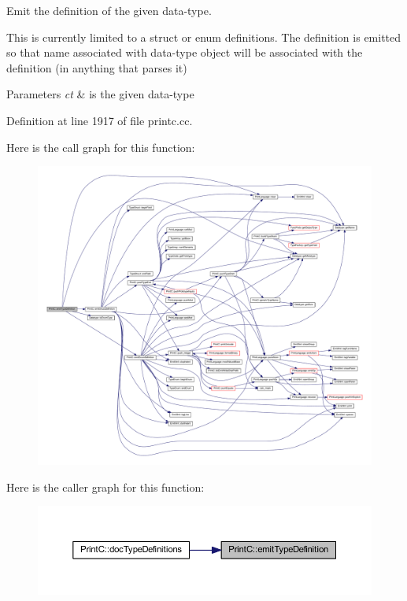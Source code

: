 Emit the definition of the given data-\/type. 

This is currently limited to a \textquotesingle{}struct\textquotesingle{} or \textquotesingle{}enum\textquotesingle{} definitions. The definition is emitted so that name associated with data-\/type object will be associated with the definition (in anything that parses it) 
\begin{DoxyParams}{Parameters}
{\em ct} & is the given data-\/type \\
\hline
\end{DoxyParams}


Definition at line 1917 of file printc.\+cc.

Here is the call graph for this function\+:
\nopagebreak
\begin{figure}[H]
\begin{center}
\leavevmode
\includegraphics[width=350pt]{class_print_c_a36b4db5295cfb6eb9a9d93b36b2a5cc8_cgraph}
\end{center}
\end{figure}
Here is the caller graph for this function\+:
\nopagebreak
\begin{figure}[H]
\begin{center}
\leavevmode
\includegraphics[width=350pt]{class_print_c_a36b4db5295cfb6eb9a9d93b36b2a5cc8_icgraph}
\end{center}
\end{figure}
\mbox{\label{class_print_c_ae05bed1958ac3b694bdeda2897e6a1ff}} 
